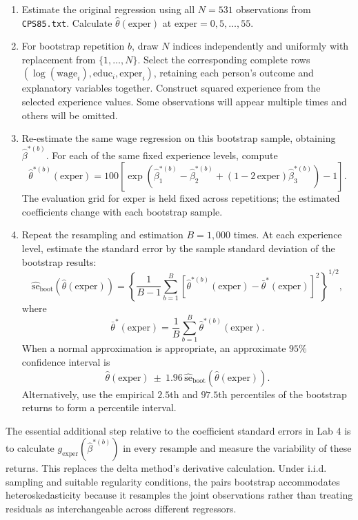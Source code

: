 \documentclass[11pt]{article}
\newcommand{\code}[1]{\texttt{#1}}
\begin{document}
\begin{enumerate}
\item Estimate the original regression using all $N=531$ observations
from \code{CPS85.txt}. Calculate $\hat\theta(\text{exper})$ at
$\text{exper}=0,5,\ldots,55$.

\item For bootstrap repetition $b$, draw $N$ indices independently and
uniformly with replacement from $\{1,\ldots,N\}$. Select the corresponding
complete rows $(\log(\text{wage}_i),\text{educ}_i,\text{exper}_i)$,
retaining each person's outcome and explanatory variables together.
Construct squared experience from the selected experience values.
Some observations will appear multiple times and others will be omitted.

\item Re-estimate the same wage regression on this bootstrap sample,
obtaining $\hat\beta^{*(b)}$. For each of the same fixed experience
levels, compute
\[
\hat\theta^{*(b)}(\text{exper})
=100\left[\exp\!\left(\hat\beta_1^{*(b)}-\hat\beta_2^{*(b)}
 +(1-2\,\text{exper})\hat\beta_3^{*(b)}\right)-1\right].
\]
The evaluation grid for $\text{exper}$ is held fixed across repetitions;
the estimated coefficients change with each bootstrap sample.

\item Repeat the resampling and estimation $B=1{,}000$ times. At each
experience level, estimate the standard error by the sample standard
deviation of the bootstrap results:
\[
\widehat{\text{se}}_{\mathrm{boot}}\!\left(\hat\theta(\text{exper})\right)
=\left\{\frac{1}{B-1}\sum_{b=1}^{B}
 \left[\hat\theta^{*(b)}(\text{exper})-\bar\theta^*(\text{exper})\right]^2\right\}^{1/2},
\]
where
\[
\bar\theta^*(\text{exper})=\frac{1}{B}\sum_{b=1}^{B}\hat\theta^{*(b)}(\text{exper}).
\]
When a normal approximation is appropriate, an approximate $95\%$
confidence interval is
\[
\hat\theta(\text{exper})\ \pm\ 1.96\,
\widehat{\text{se}}_{\mathrm{boot}}\!\left(\hat\theta(\text{exper})\right).
\]
Alternatively, use the empirical $2.5$th and $97.5$th percentiles of
the bootstrap returns to form a percentile interval.
\end{enumerate}

The essential additional step relative to the coefficient standard
errors in Lab 4 is to calculate $g_{\text{exper}}(\hat\beta^{*(b)})$ in every
resample and measure the variability of these returns. This replaces
the delta method's derivative calculation. Under i.i.d. sampling and
suitable regularity conditions, the pairs bootstrap accommodates
heteroskedasticity because it resamples the joint observations rather
than treating residuals as interchangeable across different regressors.
\end{document}
